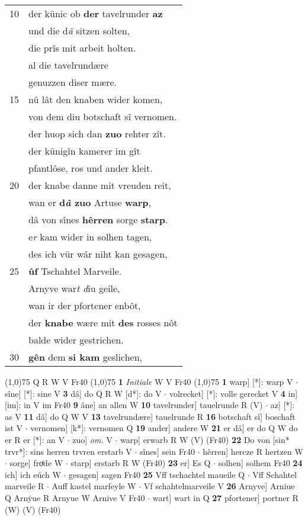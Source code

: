 \documentclass[8pt,a4paper,notitlepage]{article}
\begin{document}
\begin{table}[ht]
\begin{minipage}[t]{0.5\linewidth}
\begin{tabular}{rl}
10 & der künic ob \textbf{der} tavelrunder \textbf{az}\\ 
 & und die d\textit{â} sitzen solten,\\ 
 & die prîs mit arbeit holten.\\ 
 & al die tavelrundære\\ 
 & genuzzen diser mære.\\ 
15 & nû lât den knaben wider komen,\\ 
 & von dem diu botschaft sî vernomen.\\ 
 & der huop sich dan \textbf{zuo} rehter zît.\\ 
 & der künigîn kamerer im gît\\ 
 & pfantlôse, ros und ander kleit.\\ 
20 & der knabe danne mit vreuden reit,\\ 
 & wan er \textbf{d\textit{â} zuo} Artuse \textbf{warp},\\ 
 & dâ von sînes \textbf{hêrren} sorge \textbf{starp}.\\ 
 & e\textit{r} kam wider in solhen tagen,\\ 
 & des ich vür wâr niht kan gesagen,\\ 
25 & \textbf{ûf} Tschahtel Marveile.\\ 
 & Arnyve war\textit{t d}iu geile,\\ 
 & wan ir der pfortener enbôt,\\ 
 & der \textbf{knabe} wære mit \textbf{des} rosses nôt\\ 
 & balde wider gestrichen.\\ 
30 & \textbf{gên} dem \textbf{si kam} geslichen,\\ 
\end{tabular}
\scriptsize
\line(1,0){75} \newline
Q R W V Fr40 \newline
\line(1,0){75} \newline
\textbf{1} \textit{Initiale} W V Fr40  \newline
\line(1,0){75} \newline
\textbf{1} warp] [*]: warp V  $\cdot$ sîne] [*]: sine V \textbf{3} dâ] do Q R W [d*]: do V  $\cdot$ volrecket] [*]: volle gerecket V \textbf{4} in] [im]: in V im Fr40 \textbf{9} âne] an allen W \textbf{10} tavelrunder] tauelrunde R (V)  $\cdot$ az] [*]: as V \textbf{11} dâ] do Q W V \textbf{13} tavelrundære] tauelrunde R \textbf{16} botschaft sî] boschaft ist V  $\cdot$ vernomen] [k*]: vernomen Q \textbf{19} ander] andere W \textbf{21} er dâ] er do Q W do er R er [*]: an V  $\cdot$ zuo] \textit{om.} V  $\cdot$ warp] erwarb R W (V) (Fr40) \textbf{22} Do von [sin* trvr*]: sins herren trvren erstarb V  $\cdot$ sînes] sein Fr40  $\cdot$ hêrren] hercze R hertzen W  $\cdot$ sorge] froͤde W  $\cdot$ starp] erstarb R W (Fr40) \textbf{23} er] Es Q  $\cdot$ solhen] solhem Fr40 \textbf{24} ich] ich eúch W  $\cdot$ gesagen] sagen Fr40 \textbf{25} Vff tschachtel maueile Q  $\cdot$ Vff Schahtel marveile R  $\cdot$ Auff kastel marfeyle W  $\cdot$ Vf schahtelmarveile V \textbf{26} Arnyve] Arniue Q Arnẏue R Arnyue W Arnive V Fr40  $\cdot$ wart] wart in Q \textbf{27} pfortener] portner R (W) (V) (Fr40) \newline

\end{minipage}
\end{table}
\end{document}
